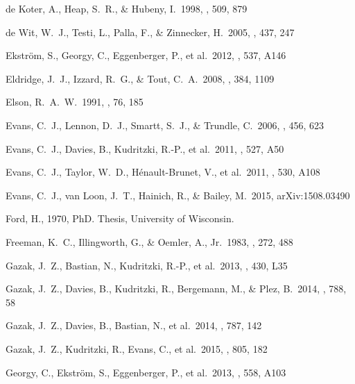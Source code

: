 \documentclass[useAMS,usenatbib]{mn2e}
\begin{document}
\begin{thebibliography}{99}
 de Koter, A., Heap,
S.~R., \& Hubeny, I.\ 1998, \apj, 509, 879

 de Wit, W.~J., Testi, L., Palla, F., \& Zinnecker, H.\ 2005, \aap, 437, 247

 Ekstr{\"o}m, S., Georgy, C., Eggenberger, P., et al.\ 2012, \aap, 537, A146

 Eldridge, J.~J.,
Izzard, R.~G., \& Tout, C.~A.\ 2008, \mnras, 384, 1109

 Elson, R.~A.~W.\ 1991, \apjs,
76, 185

 Evans, C.~J., Lennon, D.~J., Smartt, S.~J., \& Trundle, C.\ 2006, \aap, 456, 623

 Evans, C.~J., Davies, B., Kudritzki, R.-P., et al.\ 2011, \aap, 527, A50

 Evans, C.~J., Taylor, W.~D., H{\'e}nault-Brunet, V., et al.\ 2011, \aap, 530, A108

 Evans, C.~J., van Loon,
J.~T., Hainich, R., \& Bailey, M.\ 2015, arXiv:1508.03490

 Ford, H., 1970, PhD. Thesis, University of Wisconsin.

 Freeman, K.~C.,
Illingworth, G., \& Oemler, A., Jr.\ 1983, \apj, 272, 488

 Gazak, J.~Z., Bastian,
N., Kudritzki, R.-P., et al.\ 2013, \mnras, 430, L35

 Gazak, J.~Z., Davies, B.,
Kudritzki, R., Bergemann, M., \& Plez, B.\ 2014, \apj, 788, 58

 Gazak, J.~Z., Davies, B.,
Bastian, N., et al.\ 2014, \apj, 787, 142

 Gazak, J.~Z., Kudritzki,
R., Evans, C., et al.\ 2015, \apj, 805, 182

 Georgy, C., Ekstr{\"o}m, S., Eggenberger, P., et al.\ 2013, \aap, 558, A103


\end{thebibliography}
\end{document}
